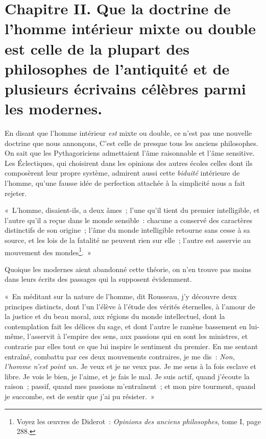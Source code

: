 \documentclass[french,twoside]{book} %
\newcommand\chapteropen{} %
\newcommand\chaptercont{} %
\begin{document}
\chapteropen
\chapter[{Chapitre II. Que la doctrine de l’homme intérieur mixte ou double est celle de la plupart des philosophes de l’antiquité et de plusieurs écrivains célèbres parmi les modernes.}]{Chapitre II. Que la doctrine de l’homme intérieur mixte ou double est celle de la plupart des philosophes de l’antiquité et de plusieurs écrivains célèbres parmi les modernes.}\renewcommand{\leftmark}{Chapitre II. Que la doctrine de l’homme intérieur mixte ou double est celle de la plupart des philosophes de l’antiquité et de plusieurs écrivains célèbres parmi les modernes.}


\chaptercont
\noindent En disant que l’homme intérieur {\itshape est} mixte ou double, ce n’est pas une nouvelle doctrine que nous annonçons, C’est celle de presque tous les anciens philosophes. On sait que les Pythagoriciens admettaient l’âme raisonnable et l’âme sensitive. Les Éclectiques, qui choisirent dans les opinions des autres écoles celles dont ils composèrent leur propre système, admirent aussi cette {\itshape biduité} intérieure de l’homme, qu’une fausse idée de perfection attachée à la simplicité nous a fait rejeter.\par
« L’homme, disaient-ils, a deux âmes ; l’une qu’il tient du premier intelligible, et l’autre qu’il a reçue dans le monde sensible : chacune a conservé des caractères distinctifs de son origine ; l’âme du monde intelligible retourne sans cesse à sa source, et les lois de la fatalité ne peuvent rien sur elle ; l’autre est asservie au mouvement des mondes\footnote{Voyez les œuvres de Diderot : {\itshape Opinions des anciens philosophes}, tome I, page 288.}. »\par
Quoique les modernes aient abandonné cette théorie, on n’en trouve pas moins dans leurs écrits des passages qui la supposent évidemment.\par
« En méditant sur la nature de l’homme, dit Rousseau, j’y découvre deux principes distincts, dont l’un l’élève à l’étude des vérités éternelles, à l’amour de la justice et du beau moral, aux régions du monde intellectuel, dont la contemplation fait les délices du sage, et dont l’autre le ramène bassement en lui-même, l’asservit à l’empire des sens, aux passions qui en sont les ministres, et contrarie par elles tout ce que lui inspire le sentiment du premier. En me sentant entraîné, combattu par ces deux mouvements contraires, je me dis : {\itshape Non, l’homme n’est point un.} Je veux et je ne veux pas. Je me sens à la fois esclave et libre. Je vois le bien, je l’aime, et je fais le mal. Je suis actif, quand j’écoute la raison ; passif, quand mes passions m’entraînent ; et mon pire tourment, quand je succombe, est de sentir que j’ai pu résister. »\par
\end{document}
